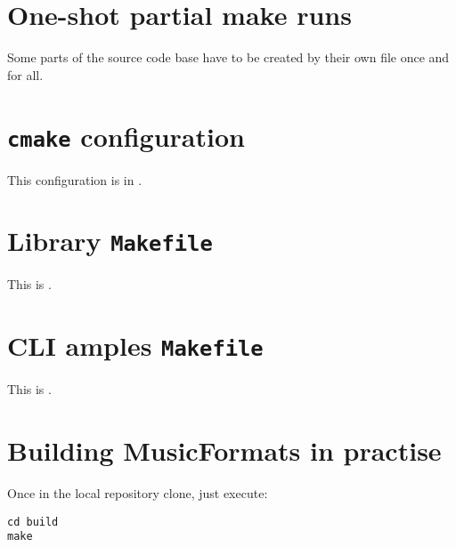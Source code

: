 \section{One-shot partial make runs}

Some parts of the source code base have to be created by their own  file once and for all. %


\section{{\tt cmake} configuration}

This configuration is in .


\section{Library {\tt Makefile}}

This  is .


\section{CLI amples {\tt Makefile}}

This  is .


\section{Building MusicFormats in practise}

Once in the local repository clone, just execute:
\begin{lstlisting}[language=Terminal]
cd build
make
\end{lstlisting}

